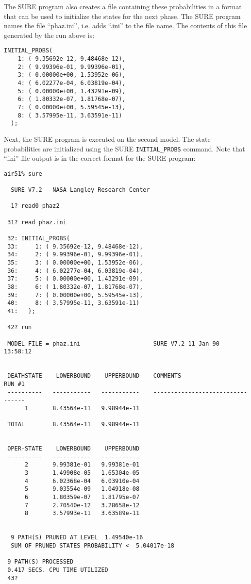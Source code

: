 The SURE program also creates a file containing these probabilities in a
format that can be used to initialize the states for the next phase.
The SURE program names the file ``phaz.ini'', i.e. adds ``.ini'' to
the file name.  The contents of this file generated by the run above
is:
\begin{verbatim}
INITIAL_PROBS(
    1: ( 9.35692e-12, 9.48468e-12),
    2: ( 9.99396e-01, 9.99396e-01),
    3: ( 0.00000e+00, 1.53952e-06),
    4: ( 6.02277e-04, 6.03819e-04),
    5: ( 0.00000e+00, 1.43291e-09),
    6: ( 1.80332e-07, 1.81768e-07),
    7: ( 0.00000e+00, 5.59545e-13),
    8: ( 3.57995e-11, 3.63591e-11)
  ); 
\end{verbatim}

Next, the SURE program is executed on the second model.  The state 
probabilities are
initialized using the SURE \verb'INITIAL_PROBS' command.  Note that
``.ini'' file output is in the correct format for the SURE
program:

\begin{verbatim}
air51% sure

  SURE V7.2   NASA Langley Research Center

  1? read0 phaz2

 31? read phaz.ini

 32: INITIAL_PROBS(
 33:     1: ( 9.35692e-12, 9.48468e-12),
 34:     2: ( 9.99396e-01, 9.99396e-01),
 35:     3: ( 0.00000e+00, 1.53952e-06),
 36:     4: ( 6.02277e-04, 6.03819e-04),
 37:     5: ( 0.00000e+00, 1.43291e-09),
 38:     6: ( 1.80332e-07, 1.81768e-07),
 39:     7: ( 0.00000e+00, 5.59545e-13),
 40:     8: ( 3.57995e-11, 3.63591e-11)
 41:   ); 

 42? run

 MODEL FILE = phaz.ini                     SURE V7.2 11 Jan 90   13:58:12


 DEATHSTATE    LOWERBOUND    UPPERBOUND    COMMENTS                 RUN #1
 ----------   -----------   -----------    ---------------------------------
      1       8.43564e-11   9.98944e-11

 TOTAL        8.43564e-11   9.98944e-11


 OPER-STATE    LOWERBOUND    UPPERBOUND
 ----------   -----------   -----------
      2       9.99381e-01   9.99381e-01
      3       1.49908e-05   1.65304e-05
      4       6.02368e-04   6.03910e-04
      5       9.03554e-09   1.04918e-08
      6       1.80359e-07   1.81795e-07
      7       2.70540e-12   3.28658e-12
      8       3.57993e-11   3.63589e-11


  9 PATH(S) PRUNED AT LEVEL  1.49540e-16
  SUM OF PRUNED STATES PROBABILITY <  5.04017e-18

 9 PATH(S) PROCESSED
 0.417 SECS. CPU TIME UTILIZED
 43? 
\end{verbatim}

